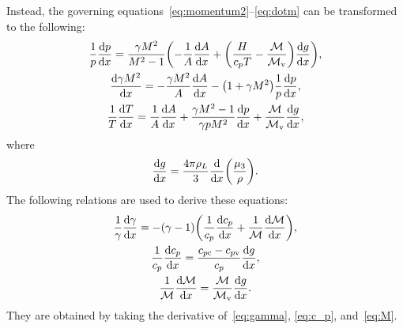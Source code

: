 \documentclass{article}
\newcommand{\vap}{\text{v}}
\newcommand{\con}{\text{c}}
\begin{document}
Instead, the governing equations~\eqref{eq:momentum2}--\eqref{eq:dotm} can be transformed to the following:
\begin{gather}
    \frac1p\dv{p}{x} = \frac{\gamma M^2}{M^2 - 1}
        \qty( -\frac1A\dv{A}{x} + \qty(\frac{H}{c_pT} - \frac{\mathcal{M}}{\mathcal{M}_\vap})\dv{g}{x} ), \label{eq:sol2:p}\\
    \dv{\gamma M^2}{x} =
        -\frac{\gamma M^2}{A}\dv{A}{x} - \qty(1 + \gamma M^2)\frac1p\dv{p}{x}, \label{eq:sol2:Ma}\\
    \frac1T\dv{T}{x} = \frac1{A}\dv{A}{x} + \frac{\gamma M^2-1}{\gamma p M^2}\dv{p}{x}
        + \frac{\mathcal{M}}{\mathcal{M}_\vap}\dv{g}{x}, \label{eq:sol2:T}
\end{gather}
where
\begin{equation}\label{eq:g_prime}
    \dv{g}{x} = \frac{4\pi\rho_L}{3}\dv{x}(\frac{\mu_3}{\rho}).
\end{equation}
The following relations are used to derive these equations:
\begin{gather}
    \frac1\gamma\dv{\gamma}{x}
        = -(\gamma-1)\qty(\frac1{c_p}\dv{c_p}{x} + \frac1{\mathcal{M}}\dv{\mathcal{M}}{x}), \label{eq:gamma_prime}\\
    \frac1{c_p}\dv{c_p}{x} = \frac{c_{p\con} - c_{p\vap}}{c_p}\dv{g}{x}, \label{eq:c_p_prime}\\
    \frac1{\mathcal{M}}\dv{\mathcal{M}}{x} = \frac{\mathcal{M}}{\mathcal{M}_\vap}\dv{g}{x}. \label{eq:barM_prime}
\end{gather}
They are obtained by taking the derivative of~\eqref{eq:gamma}, \eqref{eq:c_p}, and~\eqref{eq:M}.
\printbibliography
\end{document}
